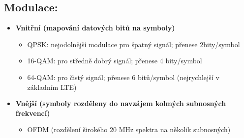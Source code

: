 \subsection{Modulace:}
\begin{itemize}
	\item \textbf{Vnitřní (mapování datových bitů na symboly)}
	\begin{itemize}	
		\item QPSK: nejodolnější modulace pro špatný signál; přenese 2bity/symbol
		\item 16-QAM: pro středně dobrý signál; přenese 4 bity/symbol
		\item 64-QAM: pro čistý signál; přenese 6 bitů/symbol (nejrychlejší v základním LTE)
	\end{itemize}
	\item \textbf{Vnější (symboly rozděleny do navzájem kolmých subnosných frekvencí)} 
	\begin{itemize}	
		\item OFDM (rozdělení širokého 20 MHz spektra na několik subnosných)
	\end{itemize}
\end{itemize}

